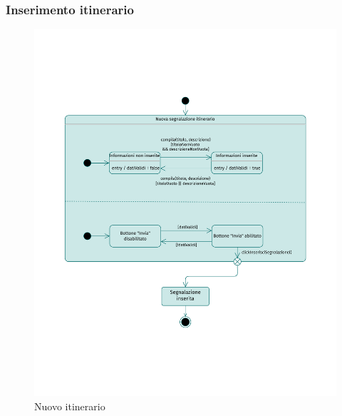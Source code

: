 \documentclass{natourDoc}
\begin{document}
\subsubsection{Inserimento itinerario}
\begin{figure}[!htbp]
	\centering
	\includegraphics[width=\textwidth, page=2]{./diagrams/statechart.pdf}
	\caption{Nuovo itinerario}
\end{figure}
\FloatBarrier

\newpage
\end{document}
